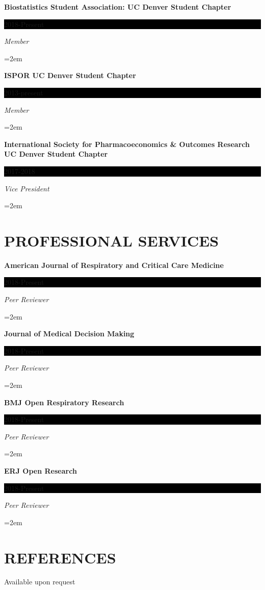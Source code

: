 \documentclass[paper=a4,fontsize=11pt]{scrartcl} %
\newcommand{\sepspace}{\vspace*{1em}}		%
\newcommand{\NewPart}[1]{\section*{\uppercase{#1}}}
\newcommand{\EducationEntry}[4]{
		\noindent \textbf{#1} \hfill      %
		\colorbox{Black}{%
			\parbox{6em}{%
			\hfill\color{White}#2}} \par  %
		\noindent \textit{#3} \par        %
		\noindent\hangindent=2em\hangafter=0 \small #4 %
		\normalsize \par}
\begin{document}
\EducationEntry{Biostatistics Student Association: UC Denver Student Chapter}{2018-Present}{Member}{}
\sepspace

\EducationEntry{ISPOR UC Denver Student Chapter}{2013-present}{Member}{}
\sepspace

\EducationEntry{International Society for Pharmacoeconomics \& Outcomes Research UC Denver Student Chapter}{2017-2018}{Vice President}{}
\sepspace

\NewPart{Professional Services}{}

\EducationEntry{American Journal of Respiratory and Critical Care Medicine
                }{2018-Present}{Peer Reviewer}{}
\EducationEntry{Journal of Medical Decision Making}{2018-Present}{Peer Reviewer}{}
\EducationEntry{BMJ Open Respiratory Research}{2018-Present}{Peer Reviewer}{}
\EducationEntry{ERJ Open Research}{2018-Present}{Peer Reviewer}{}

\sepspace


\NewPart{References}{}
Available upon request
\end{document}
